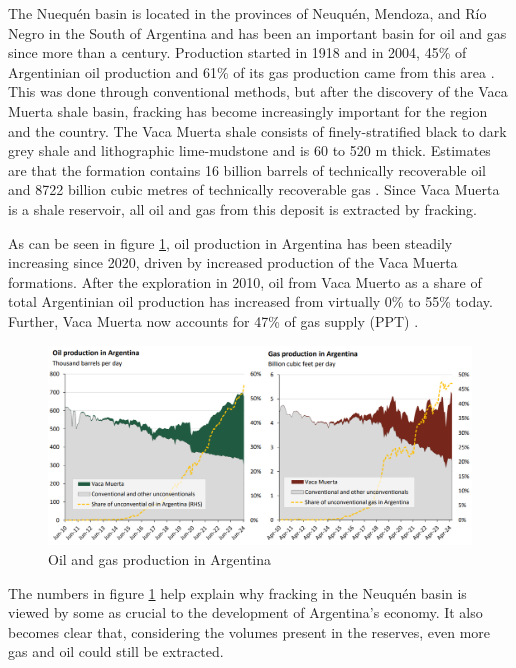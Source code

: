The Nuequén basin is located in the provinces of Neuquén, Mendoza, and Río Negro in the South of Argentina and has been an important basin for oil and gas since more than a century. Production started in 1918 and in 2004, 45\% of Argentinian oil production and 61\% of its gas production came from this area \autocite{u.s.energyinformationadministrationTechnicallyRecoverableShale2013}. This was done through conventional methods, but after the discovery of the Vaca Muerta shale basin, fracking has become increasingly important for the region and the country. The Vaca Muerta shale consists of finely-stratified black to dark grey shale and lithographic lime-mudstone and is 60 to 520 m thick. Estimates are that the formation contains 16 billion barrels of technically recoverable oil and 8722 billion cubic metres of technically recoverable gas \autocite{u.s.energyinformationadministrationTechnicallyRecoverableShale2013}. Since Vaca Muerta is a shale reservoir, all oil and gas from this deposit is extracted by fracking.

As can be seen in figure \ref{fig:oilgasprod}, oil production in Argentina has been steadily increasing since 2020, driven by increased production of the Vaca Muerta formations. After the exploration in 2010, oil from Vaca Muerto as a share of total Argentinian oil production has increased from virtually 0\% to 55\% today. Further, Vaca Muerta now accounts for 47\% of gas supply (PPT) \autocite{internationaltradeadministrationArgentinaCountryCommercial2025}.

\begin{figure}[H]
    \centering
    \includegraphics[width=1\linewidth]{figures/ch9/oilgasproduction.png}
    \caption{Oil and gas production in Argentina \autocite{internationaltradeadministrationArgentinaCountryCommercial2025}}
    \label{fig:oilgasprod}
\end{figure}

The numbers in figure \ref{fig:oilgasprod} help explain why fracking in the Neuquén basin is viewed by some as crucial to the development of Argentina's economy. It also becomes clear that, considering the volumes present in the reserves, even more gas and oil could still be extracted.

